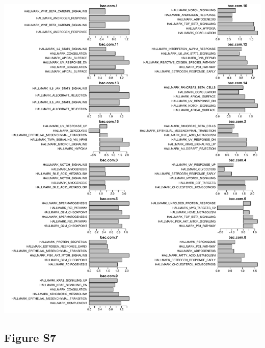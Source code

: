 \documentclass[
]{article}
\begin{document}
\includegraphics[width=1\linewidth]{manuscript_template_files/figure-latex/unnamed-chunk-15-1}

\clearpage

\hypertarget{figure-s7}{%
\subsection{Figure S7}\label{figure-s7}}
\end{document}
